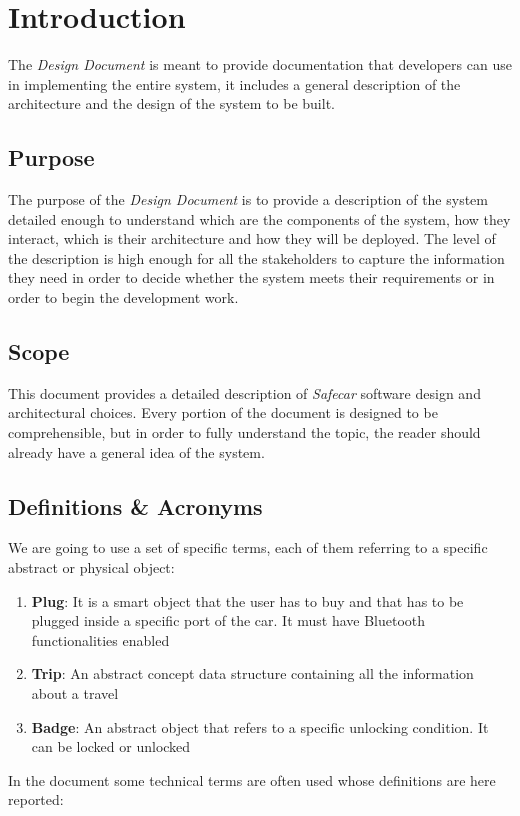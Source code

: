 \chapter{Introduction} \label{chap1}
The \textit{Design Document} is meant to provide documentation that developers can use in implementing the entire system, it includes a general description of the architecture and the design of the system to be built.

\section{Purpose}
The purpose of the \textit{Design Document} is to provide a description of the system detailed enough to understand which are the components of the system, how they interact, which is their architecture and how they will be deployed. The level of the description is high enough for all the stakeholders to capture the information they need in order to decide whether the system meets their requirements or in order to begin the development work.

\section{Scope}
This document provides a detailed description of \textit{Safecar} software design and architectural choices. Every portion of the document is designed to be comprehensible, but in order to fully understand the topic, the reader should already have a general idea of the system.

\section{Definitions \& Acronyms}
We are going to use a set of specific terms, each of them referring to a specific abstract or physical object:

\begin{enumerate}
	\item \textbf{Plug}: It is a smart object that the user has to buy and that has to be plugged inside a specific port of the car. It must have Bluetooth functionalities enabled
	\item \textbf{Trip}: An abstract concept data structure containing all the information about a travel
	\item \textbf{Badge}: An abstract object that refers to a specific unlocking condition. It can be locked or unlocked
\end{enumerate}
In the document some technical terms are often used whose definitions are here reported:

